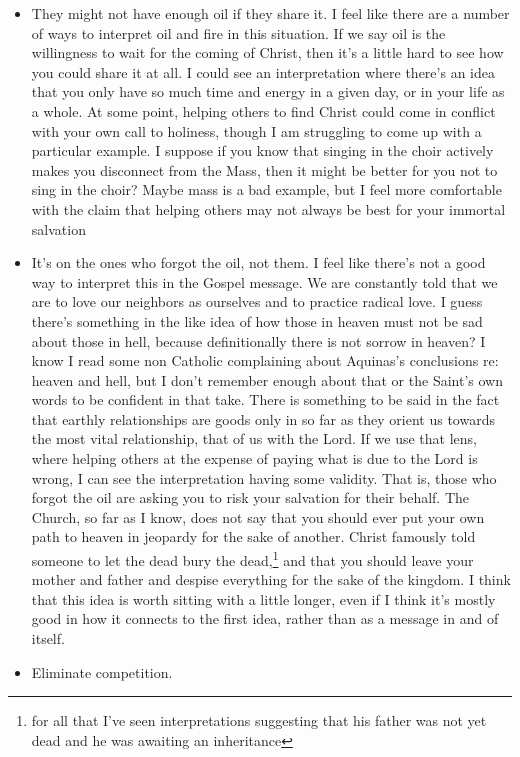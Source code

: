 \documentclass[12pt]{article}[titlepage]
\newcommand{\1}{\={a}}
\newcommand{\2}{\={e}}
\newcommand{\3}{\={\i}}
\newcommand{\4}{\=o}
\newcommand{\5}{\=u}
\newcommand{\6}{\={A}}
\renewcommand{\,}{\textsuperscript{,}}
\begin{document}
\begin{itemize}
\item They might not have enough oil if they share it.
I feel like there are a number of ways to interpret oil and fire in this situation.
If we say oil is the willingness to wait for the coming of Christ, then it's a little hard to see how you could share it at all.
I could see an interpretation where there's an idea that you only have so much time and energy in a given day, or in your life as a whole.
At some point, helping others to find Christ could come in conflict with your own call to holiness, though I am struggling to come up with a particular example.
I suppose if you know that singing in the choir actively makes you disconnect from the Mass, then it might be better for you not to sing in the choir?
Maybe mass is a bad example, but I feel more comfortable with the claim that helping others may not always be best for your immortal salvation
\item It's on the ones who forgot the oil, not them.
I feel like there's not a good way to interpret this in the Gospel message.
We are constantly told that we are to love our neighbors as ourselves and to practice radical love.
I guess there's something in the like idea of how those in heaven must not be sad about those in hell, because definitionally there is not sorrow in heaven?
I know I read some non Catholic complaining about Aquinas's conclusions re: heaven and hell, but I don't remember enough about that or the Saint's own words to be confident in that take.
There is something to be said in the fact that earthly relationships are goods only in so far as they orient us towards the most vital relationship, that of us with the Lord.
If we use that lens, where helping others at the expense of paying what is due to the Lord is wrong, I can see the interpretation having some validity.
That is, those who forgot the oil are asking you to risk your salvation for their behalf.
The Church, so far as I know, does not say that you should ever put your own path to heaven in jeopardy for the sake of another.
Christ famously told someone to let the dead bury the dead,\footnote{for all that I've seen interpretations suggesting that his father was not yet dead and he was awaiting an inheritance} and that you should leave your mother and father and despise everything for the sake of the kingdom.
I think that this idea is worth sitting with a little longer, even if I think it's mostly good in how it connects to the first idea, rather than as a message in and of itself.
\item Eliminate competition.

\end{itemize}
\end{document}
